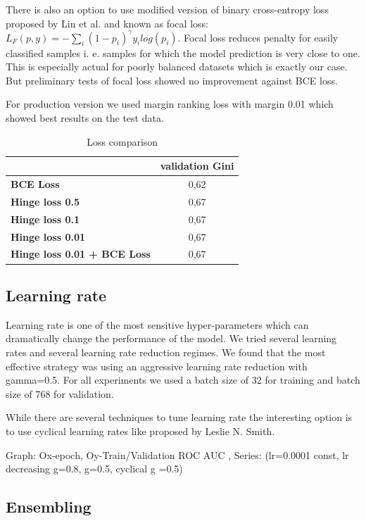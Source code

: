 \documentclass{sigkddExp}
\begin{document}
There is also an option to use modified version of binary cross-entropy loss proposed by Lin et al.\cite{DBLP:journals/corr/abs-1708-02002} and known as focal loss: $L_F(p, y) = -\sum_i (1 - p_i)^\gamma y_i log(p_i)$. Focal loss reduces penalty for easily classified samples i. e. samples for which the model prediction is very close to one. This is especially actual for poorly balanced datasets which is exactly our case. But preliminary tests of focal loss showed no improvement against BCE loss.

For production version we used margin ranking loss with margin 0.01 which showed best results on the test data. 

\begin{table}
\caption{Loss comparison}
\begin{tabular}{ | l | c |  }
\hline
& \textbf{validation Gini} \\
\hline
\textbf{BCE Loss} & 0,62  \\
\textbf{Hinge loss 0.5} & 0,67  \\
\textbf{Hinge loss 0.1} & 0,67  \\
\textbf{Hinge loss 0.01} & 0,67  \\
\textbf{Hinge loss 0.01 + BCE Loss} & 0,67  \\
\hline
\end{tabular}
\label{tab4}
\end{table}

\subsection{Learning rate}

Learning rate is one of the most sensitive hyper-parameters which can dramatically change the performance of the model. We tried several learning rates and several learning rate reduction regimes. We found that the most effective strategy was using an aggressive learning rate reduction with gamma=0.5.
For all experiments we used a batch size of 32 for training and batch size of 768 for validation.

While there are several techniques to tune learning rate the interesting option is to use cyclical learning rates like proposed by Leslie N. Smith.\cite{DBLP:journals/corr/Smith15a}

Graph: Ox-epoch, Oy-Train/Validation ROC AUC , Series: (lr=0.0001 const, lr decreasing g=0.8, g=0.5, cyclical g =0.5) 


\subsection{Ensembling}
\end{document}
